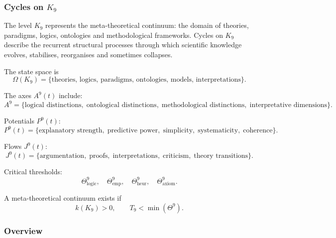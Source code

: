
\subsubsection{Cycles on \texorpdfstring{$K_9$}{K_9}}
\label{sec:cycles-k9}

The level $K_9$ represents the meta-theoretical continuum: the domain of
theories, paradigms, logics, ontologies and methodological frameworks.
Cycles on $K_9$ describe the recurrent structural processes through which
scientific knowledge evolves, stabilises, reorganises and sometimes collapses.

The state space is
\[
  \Omega(K_9)
  =
  \{\text{theories, logics, paradigms, ontologies, models, interpretations}\}.
\]

The axes $A^9(t)$ include:
\[
  A^9 = \{
     \text{logical distinctions},\;
     \text{ontological distinctions},\;
     \text{methodological distinctions},\;
     \text{interpretative dimensions}
  \}.
\]

Potentials $P^9(t)$:
\[
  P^9(t)
  = \{\text{explanatory strength},\; \text{predictive power},\;
        \text{simplicity},\; \text{systematicity},\; \text{coherence}\}.
\]

Flows $J^9(t)$:
\[
  J^9(t) = \{
    \text{argumentation},\;
    \text{proofs},\;
    \text{interpretations},\;
    \text{criticism},\;
    \text{theory transitions}
  \}.
\]

Critical thresholds:
\[
  \Theta^9_\mathrm{logic},\quad
  \Theta^9_\mathrm{emp},\quad
  \Theta^9_\mathrm{heur},\quad
  \Theta^9_\mathrm{axiom}.
\]

A meta-theoretical continuum exists if
\[
  k(K_9)>0,\qquad
  T_9 < \min(\Theta^9).
\]


\subsubsection{Overview}

